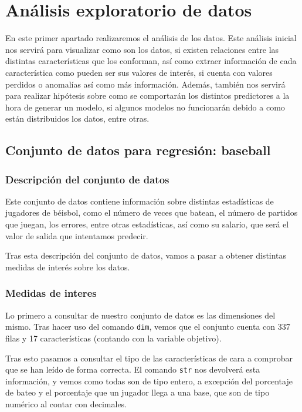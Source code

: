 \section{Análisis exploratorio de datos}

En este primer apartado realizaremos el análisis de los datos. Este análisis inicial nos servirá para visualizar como son los datos, si existen relaciones entre las distintas características que los conforman, así como extraer información de cada característica como pueden ser sus valores de interés, si cuenta con valores perdidos o anomalías así como más información. Además, también nos servirá para realizar hipótesis sobre como se comportarán los distintos predictores a la hora de generar un modelo, si algunos modelos no funcionarán debido a como están distribuidos los datos, entre otras.

\subsection{Conjunto de datos para regresión: baseball}

\subsubsection{Descripción del conjunto de datos}

Este conjunto de datos contiene información sobre distintas estadísticas de jugadores de béisbol, como el número de veces que batean, el número de partidos que juegan, los errores, entre otras estadísticas, así como su salario, que será el valor de salida que intentamos predecir.

Tras esta descripción del conjunto de datos, vamos a pasar a obtener distintas medidas de interés sobre los datos.


\subsubsection{Medidas de interes}

Lo primero a consultar de nuestro conjunto de datos es las dimensiones del mismo. Tras hacer uso del comando \texttt{dim}, vemos que el conjunto cuenta con 337 filas y 17 características (contando con la variable objetivo).

Tras esto pasamos a consultar el tipo de las características de cara a comprobar que se han leído de forma correcta. El comando \texttt{str} nos devolverá esta información, y vemos como todas son de tipo entero, a excepción del porcentaje de bateo y el porcentaje que un jugador llega a una base, que son de tipo numérico al contar con decimales.

